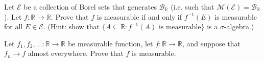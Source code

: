 \documentclass[12pt]{article}
\newenvironment{problem}[2][Problem]{\begin{trivlist}
\item[\hskip \labelsep {\bfseries #1}\hskip \labelsep {\bfseries
#2.}]}{\end{trivlist}}
\begin{document}
\begin{problem}{43}
Let $\mathcal{E}$ be a collection of Borel sets that generates $\mathcal{B}_{\mathbb{R}}$ (i.e. such that $\mathcal{M}(\mathcal{E}) = \mathcal{B}_{\mathbb{R}}$). Let $f : \mathbb{R} \to \mathbb{R}$. Prove that $f$ is measurable if and only if $f^{-1}(E)$ is measurable for all $E \in \mathcal{E}$. (Hint: show that $\{A \subseteq \mathbb{R} : f^{-1}(A)\text{ is measurable}\}$ is a $\sigma$-algebra.)
\end{problem}

\begin{problem}{44}
Let $f_1,f_2,\dots : \mathbb{R} \to \mathbb{R}$ be measurable function, let $f : \mathbb{R} \to \mathbb{R}$, and suppose that $f_n \to f$ almost everywhere. Prove that $f$ is measurable.
\end{problem}

\end{document}
